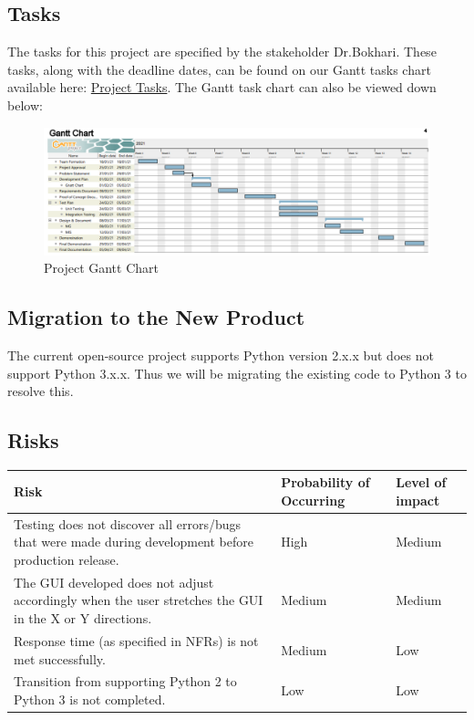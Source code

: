\documentclass[12pt, titlepage]{article}
\begin{document}
\subsection{Tasks}
The tasks for this project are specified by the stakeholder Dr.Bokhari. These tasks, along with the deadline dates, can be found on our Gantt tasks chart available here: \href{https://gitlab.cas.mcmaster.ca/bargea/3xa3-g09-2021/-/blob/master/BlankProjectTemplate/ProjectSchedule/3XA3\%20Group\%20Project.pdf}{Project Tasks}. The Gantt task chart can also be viewed down below: 
\begin{figure}[h]
    \centering
    \includegraphics[scale=0.55]{GanttChart}
    \caption{Project Gantt Chart}
    \label{fig:GanttChart}
\end{figure}


\subsection{Migration to the New Product}
The current open-source project supports Python version 2.x.x but does not support Python 3.x.x. Thus we will be migrating the existing code to Python 3 to resolve this.

\newpage
\subsection{Risks}
\begin{table}[h!]
\centering
\begin{tabular}{ |p{7cm}|p{3cm}|p{3cm}| } 
\hline
Risk & Probability of Occurring & Level of impact \\
\hline
Testing does not discover all errors/bugs that were made during development before production release. & High & Medium \\ 
\hline
The GUI developed does not adjust accordingly when the user stretches the GUI in the X or Y directions. & Medium & Medium \\
\hline
Response time (as specified in NFRs) is not met successfully. & Medium & Low \\ 
\hline
Transition from supporting Python 2 to Python 3 is not completed. & Low & Low \\ 
\hline
\end{tabular}
\end{table}
\end{document}
